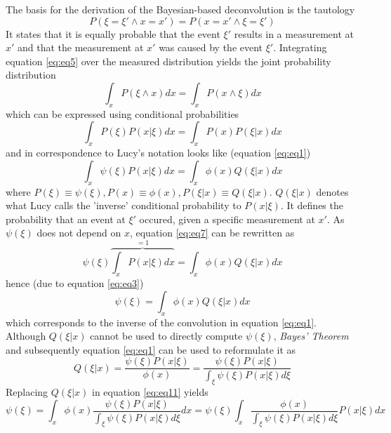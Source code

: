 \documentclass[]{spie}  %
\begin{document}
\noindent The basis for the derivation of the Bayesian-based deconvolution is the tautology
\begin{equation}
\label{eq:eq5}
P(\xi=\xi' \wedge x=x') = P(x=x' \wedge \xi=\xi')
\end{equation}
It states that it is equally probable that the event $\xi'$ results in a measurement at $x'$ and that the measurement at $x'$ was caused by the event $\xi'$. Integrating equation \ref{eq:eq5} over the measured distribution yields the joint probability distribution
\begin{equation}
\int_x P(\xi \wedge x) dx = \int_x P(x \wedge \xi) dx
\end{equation}
which can be expressed using conditional probabilities
\begin{equation}
\int_x P(\xi) P(x|\xi) dx = \int_x P(x) P(\xi|x) dx
\end{equation}
and in correspondence to Lucy's notation looks like (equation \ref{eq:eq1})
\begin{equation}
\label{eq:eq7}
\int_x \psi(\xi) P(x|\xi) dx = \int_x \phi(x) Q(\xi|x) dx
\end{equation}
where $P(\xi) \equiv \psi(\xi), P(x) \equiv \phi(x), P(\xi|x) \equiv Q(\xi|x)$. $Q(\xi|x)$ denotes what Lucy calls the 'inverse' conditional probability to $P(x|\xi)$. It defines the probability that an event at $\xi'$ occured, given a specific measurement at $x'$. As $\psi(\xi)$ does not depend on $x$, equation \ref{eq:eq7} can be rewritten as
\begin{equation}
\label{eq:eq9}
\psi(\xi) \overbrace{\int_x P(x|\xi) dx}^{=1} = \int_x \phi(x) Q(\xi|x) dx
\end{equation}
hence (due to equation \ref{eq:eq3})
\begin{equation}
\label{eq:eq11}
\psi(\xi) = \int_x \phi(x) Q(\xi|x) dx
\end{equation}
which corresponds to the inverse of the convolution in equation \ref{eq:eq1}. Although $Q(\xi|x)$ cannot be used to directly compute $\psi(\xi)$, \emph{Bayes' Theorem} and subsequently equation \ref{eq:eq1} can be used to reformulate it as
\begin{equation}
\label{eq:eq12}
Q(\xi|x) = \frac{\psi(\xi) P(x|\xi)}{\phi(x)} =  \frac{\psi(\xi) P(x|\xi)}{\int_\xi \psi(\xi) P(x|\xi) d\xi}
\end{equation}
Replacing $Q(\xi|x)$ in equation \ref{eq:eq11} yields
\begin{equation}
\label{eq:eq13}
\psi(\xi) = \int_x \phi(x) \frac{\psi(\xi) P(x|\xi)}{\int_\xi \psi(\xi) P(x|\xi) d\xi} dx
          = \psi(\xi) \int_x  \frac{ \phi(x) }{\int_\xi \psi(\xi) P(x|\xi) d\xi} P(x|\xi) dx
\end{equation}
\end{document}
